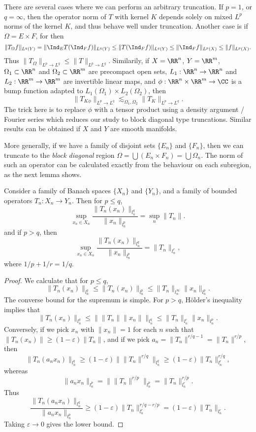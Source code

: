 There are several cases where we can perform an arbitrary truncation. If $p = 1$, or $q = \infty$, then the operator norm of $T$ with kernel $K$ depends solely on mixed $L^p$ norms of the kernel $K$, and thus behave well under truncation. Another case is if $\Omega = E \times F$, for then
%
\[ \| T_\Omega f \|_{L^q(Y)} = \| \Ind_E T(\Ind_F f) \|_{L^q(Y)} \leq \| T(\Ind_F f) \|_{L^q(Y)} \leq \| \Ind_F f \|_{L^p(X)} \leq \| f \|_{L^p(X)}. \]
%
Thus $\| T_\Omega \|_{L^p \to L^q} \leq \| T \|_{L^p \to L^q}$. Similarily, if $X = \RR^n$, $Y = \RR^m$, $\Omega_1 \subset \RR^n$ and $\Omega_2 \subset \RR^m$ are precompact open sets, $L_1: \RR^n \to \RR^n$ and $L_2: \RR^m \to \RR^m$ are invertible linear maps, and $\phi: \RR^n \times \RR^m \to \CC$ is a bump function adapted to $L_1(\Omega_1) \times L_2(\Omega_2)$, then
%
\[ \| T_{K \phi} \|_{L^p \to L^q} \lesssim_{\Omega_1,\Omega_2} \| T_K \|_{L^p \to L^q}. \]
%
The trick here is to replace $\phi$ with a tensor product using a density argument / Fourier series which reduces our study to block diagonal type truncations. Similar results can be obtained if $X$ and $Y$ are smooth manifolds.

More generally, if we have a family of disjoint sets $\{ E_n \}$ and $\{ F_n \}$, then we can truncate to the \emph{block diagonal} region $\Omega = \bigcup (E_n \times F_n) = \bigcup \Omega_n$. The norm of such an operator can be calculated exactly from the behaviour on each subregion, as the next lemma shows.

\begin{lemma}
    Consider a family of Banach spaces $\{ X_n \}$ and $\{ Y_n \}$, and a family of bounded operators $T_n: X_n \to Y_n$. Then for $p \leq q$,
    \[ \sup_{x_n \in X_n} \frac{\| T_n(x_n) \|_{l^q_n}}{\| x_n \|_{l^p_n}} = \sup_n \| T_n \|. \]
    and if $p > q$, then
    \[ \sup_{x_n \in X_n} \frac{\| T_n(x_n) \|_{l^q_n}}{\| x_n \|_{l^p_n}} = \| T_n \|_{l^r_n}, \]
    where $1/p + 1/r = 1/q$.
\end{lemma}
\begin{proof}
    We calculate that for $p \leq q$,
    \[ \| T_n(x_n) \|_{l^q_n} \leq \| T_n(x_n) \|_{l^p_n} \leq \| T_n \|_{l^\infty_n} \| x_n \|_{l^p_n}. \]
    The converse bound for the supremum is simple. For $p > q$, H\"{o}lder's inequality implies that
    \[ \| T_n(x_n) \|_{l^q_n} \leq \| \| T_n \| \| x_n \| \|_{l^q_n} \leq \| T_n \|_{l^r_n} \| x_n \|_{l^p_n}. \]
    Conversely, if we pick $x_n$ with $\| x_n \| = 1$ for each $n$ such that $\| T_n(x_n) \| \geq (1 - \varepsilon) \| T_n \|$, and if we pick $a_n = \| T_n \|^{r/q - 1} = \| T_n \|^{r/p}$, then
    \[ \| T_n(a_n x_n) \|_{l^q_n} \geq (1 - \varepsilon) \| \| T_n \|^{r/q} \|_{l^q_n} \geq (1 - \varepsilon) \| T_n \|_{l^r_n}^{r/q}, \]
    whereas
    \[ \| a_n x_n \|_{l^p_n} = \| \| T_n \|^{r/p} \|_{l^p_n} = \| T_n \|_{l^r_n}^{r/p}. \]
    Thus
    \[ \frac{\| T_n(a_n x_n) \|_{l^q_n}}{\| a_n x_n \|_{l^p_n}} \geq (1 - \varepsilon) \| T_n \|_{l^r_n}^{r/q - r/p} = (1 - \varepsilon) \| T_n \|_{l^r_n}. \]
    Taking $\varepsilon \to 0$ gives the lower bound.
\end{proof}


